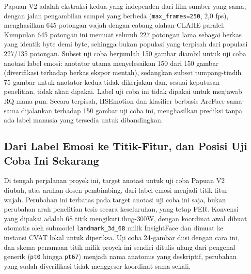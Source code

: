 Papuan V2 adalah ekstraksi kedua yang independen dari film sumber yang sama, dengan jalan pengambilan sampel yang berbeda (\texttt{max\_frames=250}, 2,0 fps), menghasilkan 645 potongan wajah dengan cabang olahan-CLAHE paralel. Kumpulan 645 potongan ini memuat seluruh 227 potongan lama sebagai berkas yang identik byte demi byte, sehingga bukan populasi yang terpisah dari populasi 227/135 potongan. Subset uji coba berjumlah 150 gambar diambil untuk uji coba anotasi label emosi: anotator utama menyelesaikan 150 dari 150 gambar (diverifikasi terhadap berkas ekspor mentah), sedangkan subset tumpang-tindih 75 gambar untuk anotator kedua tidak dikerjakan dan, sesuai keputusan penelitian, tidak akan dipakai. Label uji coba ini tidak dipakai untuk menjawab RQ mana pun. Secara terpisah, HSEmotion dan klasifier berbasis ArcFace sama-sama dijalankan terhadap 150 gambar uji coba ini, menghasilkan prediksi tanpa ada label manusia yang tersedia untuk dibandingkan.

\subsection{Dari Label Emosi ke Titik-Fitur, dan Posisi Uji Coba Ini Sekarang}

Di tengah perjalanan proyek ini, target anotasi untuk uji coba Papuan V2 diubah, atas arahan dosen pembimbing, dari label emosi menjadi titik-fitur wajah. Perubahan ini terbatas pada target anotasi uji coba ini saja, bukan perubahan arah penelitian tesis secara keseluruhan, yang tetap FER. Konvensi yang dipakai adalah 68 titik mengikuti ibug-300W, dengan koordinat awal dibuat otomatis oleh submodel \texttt{landmark\_3d\_68} milik InsightFace dan dimuat ke instansi CVAT\label{abbr:CVAT} lokal untuk diperiksa. Uji coba 24-gambar diisi dengan cara ini, dan skema penamaan titik milik proyek ini sendiri ditulis ulang dari pengenal generik (\texttt{pt0} hingga \texttt{pt67}) menjadi nama anatomis yang deskriptif, perubahan yang sudah diverifikasi tidak menggeser koordinat sama sekali.

